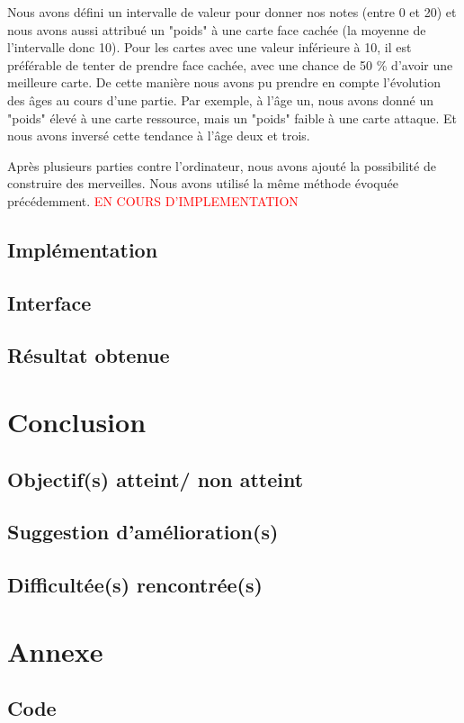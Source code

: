 \documentclass[a4paper, 12pt, french]{article}
\begin{document}
		Nous avons défini un intervalle de valeur pour donner nos notes (entre 0 et 20)
		et nous avons aussi attribué un "poids" à une carte face cachée (la moyenne de l'intervalle donc 10).
		Pour les cartes avec une valeur inférieure à 10, il est préférable de tenter de prendre face cachée,
		avec une chance de 50 \% d'avoir une meilleure carte. De cette manière nous avons pu prendre en compte
		l'évolution des âges au cours d'une partie. Par exemple, à l'âge un, nous avons donné un "poids" élevé à une
		carte ressource, mais un "poids" faible à une carte attaque. Et nous avons inversé cette tendance à
		l'âge deux et trois.

		Après plusieurs parties contre l'ordinateur, nous avons ajouté la possibilité de construire des merveilles.
		Nous avons utilisé la même méthode évoquée précédemment. \textcolor{red}{EN COURS D'IMPLEMENTATION}
	\subsection{Implémentation}
	\subsection{Interface}
	\subsection{Résultat obtenue}

	\section{Conclusion}
	\subsection{Objectif(s) atteint/ non atteint}
	\subsection{Suggestion d'amélioration(s)}
	\subsection{Difficultée(s) rencontrée(s)}

	\section{Annexe}
	\subsection{Code}

	\newpage
	\printbibliography
\end{document}
